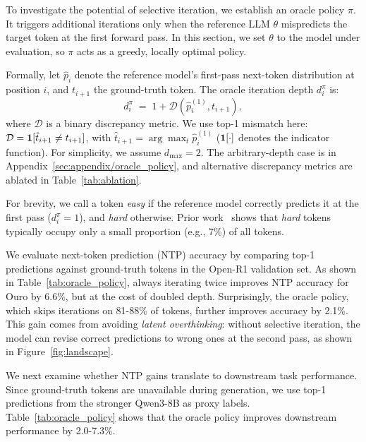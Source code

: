 To investigate the potential of selective iteration, we establish an oracle policy $\pi$. It triggers additional iterations only when the reference LLM $\theta$ mispredicts the target token at the first forward pass.
In this section, we set $\theta$ to the model under evaluation, so $\pi$ acts as a greedy, locally optimal policy.

Formally, let $\hat{p}_i$ denote the reference model's first-pass next-token distribution at position $i$, and $t_{i+1}$ the ground-truth token.
The oracle iteration depth $d_i^{\pi}$ is:
\begin{equation}
    d_i^{\pi} \;=\; 1+\mathcal{D}(\hat{p}_i^{(1)}, t_{i+1}),
    \label{eq:ours_oracle_depth}
\end{equation}
where $\mathcal{D}$ is a binary discrepancy metric.
We use top-1 mismatch here: $\mathcal{D} = \bm{1}[\hat{t}_{i+1} \neq t_{i+1}]$, with $\hat{t}_{i+1}=\arg\max_{t} \hat{p}_i^{(1)}$ ($\bm{1}[\cdot]$ denotes the indicator function).
For simplicity, we assume $d_{\max}=2$. The arbitrary-depth case is in Appendix~\ref{sec:appendix/oracle_policy}, and alternative discrepancy metrics are ablated in Table~\ref{tab:ablation}.

For brevity, we call a token \emph{easy} if the reference model correctly predicts it at the first pass ($d_i^{\pi}=1$), and \emph{hard} otherwise.
Prior work~\citep{fu2025r2r} shows that \emph{hard} tokens typically occupy only a small proportion (e.g., $7\%$) of all tokens.

We evaluate next-token prediction (NTP) accuracy by comparing top-1 predictions against ground-truth tokens in the Open-R1 validation set.
As shown in Table~\ref{tab:oracle_policy}, always iterating twice improves NTP accuracy for Ouro by 6.6\%, but at the cost of doubled depth.
Surprisingly, the oracle policy, which skips iterations on 81-88\% of tokens, further improves accuracy by 2.1\%.
This gain comes from avoiding \emph{latent overthinking}: without selective iteration, the model can revise correct predictions to wrong ones at the second pass, as shown in Figure~\ref{fig:landscape}.

We next examine whether NTP gains translate to downstream task performance.
Since ground-truth tokens are unavailable during generation, we use top-1 predictions from the stronger Qwen3-8B as proxy labels.
Table~\ref{tab:oracle_policy} shows that the oracle policy improves downstream performance by 2.0-7.3\%.

